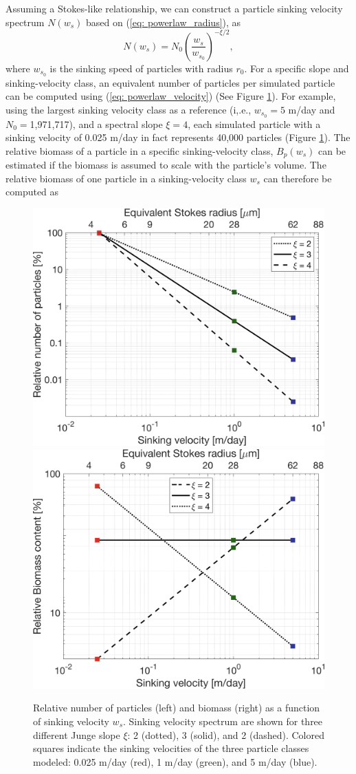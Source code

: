 \documentclass[article,linenumbers]{agujournal2018}
\begin{document}
Assuming a Stokes-like relationship, we can construct a particle sinking velocity spectrum $N(w_s)$ based on (\ref{eq: powerlaw_radius}), as
\begin{equation}
N(w_s) = N_0 \left(\frac{w_s}{w_{s_0}}\right)^{-\xi/2},
\label{eq: powerlaw_velocity}
\end{equation}
where $w_{s_0}$ is the sinking speed of particles with radius $r_0$.
For a specific slope and sinking-velocity class, an equivalent number of particles per simulated particle can be computed using (\ref{eq: powerlaw_velocity}) (See Figure \ref{fig: sinking_velocity_spectrum}). For example, using the largest sinking velocity class as a reference (i,.e., $w_{s_0} = 5$ m/day and $N_0=$1,971,717), and a spectral slope $\xi = 4$, each simulated particle with a sinking velocity of 0.025 m/day in fact represents 40,000 particles (Figure \ref{fig: sinking_velocity_spectrum}). The relative biomass of a particle in a specific sinking-velocity class, $B_p(w_s)$ can be estimated if the biomass is assumed to scale with the particle's volume. The relative biomass of one particle in a sinking-velocity class $w_s$ can therefore be computed as
\begin{figure}[ht]
	\centering
	\includegraphics[width = .49\linewidth]{figures/Fig4b.png}
	\includegraphics[width = .49\linewidth]{figures/Fig4a.png}
	\caption{Relative number of particles (left) and biomass (right) as a function of sinking velocity $w_s$. Sinking velocity spectrum are shown for three different Junge slope $\xi$: 2 (dotted), 3 (solid), and 2 (dashed). Colored squares indicate the sinking velocities of the three particle classes modeled: 0.025 m/day (red), 1 m/day (green), and 5 m/day (blue).}
	\label{fig: sinking_velocity_spectrum}
\end{figure}
\end{document}

